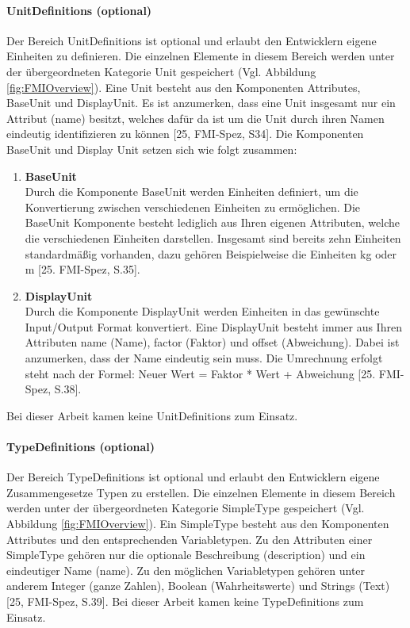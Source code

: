 \paragraph{UnitDefinitions (optional)}\label{sec:UnitDefinitions}
\noindent Der Bereich UnitDefinitions ist optional und erlaubt den Entwicklern eigene Einheiten zu definieren.  Die einzelnen Elemente in diesem Bereich werden unter der übergeordneten Kategorie Unit gespeichert (Vgl. Abbildung \ref{fig:FMIOverview}). Eine Unit besteht aus den Komponenten Attributes, BaseUnit und DisplayUnit. Es ist anzumerken, dass eine Unit insgesamt nur ein Attribut (name) besitzt, welches dafür da ist um die Unit durch ihren Namen eindeutig identifizieren zu können [25, FMI-Spez, S34]. Die Komponenten BaseUnit und Display Unit setzen sich wie folgt zusammen:
\begin{enumerate}
	\item \textbf{BaseUnit} \\
	Durch die Komponente BaseUnit werden Einheiten definiert, um die Konvertierung zwischen
	verschiedenen Einheiten zu ermöglichen. Die BaseUnit Komponente besteht lediglich aus 
	Ihren eigenen Attributen, welche die verschiedenen Einheiten darstellen. Insgesamt sind 
	bereits zehn Einheiten standardmäßig vorhanden, dazu gehören Beispielweise die Einheiten 
	kg oder m [25. FMI-Spez, S.35].
	\item \textbf{DisplayUnit} \\
	Durch die Komponente DisplayUnit werden Einheiten in das gewünschte Input/Output
	Format konvertiert. Eine DisplayUnit besteht immer aus Ihren Attributen name (Name), 
	factor (Faktor) und offset (Abweichung). Dabei ist anzumerken, dass der Name eindeutig sein 
	muss. Die Umrechnung erfolgt steht nach der Formel: Neuer Wert = Faktor * Wert + 
	Abweichung [25. FMI-Spez, S.38].
\end{enumerate}
Bei dieser Arbeit kamen keine UnitDefinitions zum Einsatz.

\paragraph{TypeDefinitions (optional)}\label{sec:TypeDefinitions}
\noindent Der Bereich TypeDefinitions ist optional und erlaubt den Entwicklern eigene Zusammengesetze Typen zu erstellen. Die einzelnen Elemente in diesem Bereich werden unter der übergeordneten Kategorie SimpleType gespeichert (Vgl. Abbildung \ref{fig:FMIOverview}). Ein SimpleType besteht aus den Komponenten Attributes und den entsprechenden Variabletypen. Zu den Attributen einer SimpleType gehören nur die optionale Beschreibung (description) und ein eindeutiger Name (name). Zu den möglichen Variabletypen gehören unter anderem Integer (ganze Zahlen), Boolean (Wahrheitswerte) und Strings (Text) [25, FMI-Spez, S.39].
\newline
Bei dieser Arbeit kamen keine TypeDefinitions zum Einsatz.

